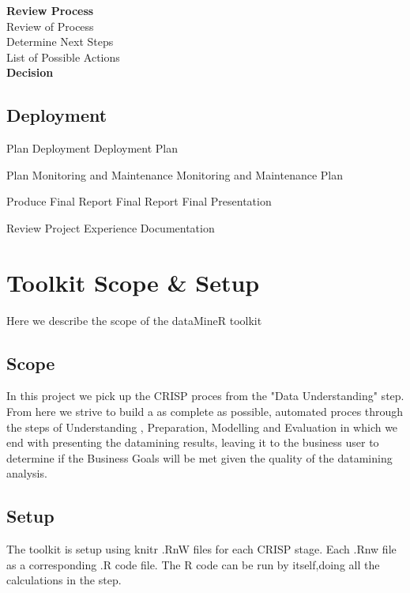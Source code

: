\documentclass[12pt,a4paper,titlepage]{report}\usepackage{graphicx, color}
\begin{document}
\textbf{Review Process} \\ 
Review of Process \\

Determine Next Steps \\
List of Possible Actions \\

\textbf{Decision}

\subsection{Deployment}
Plan Deployment
Deployment Plan

Plan Monitoring and Maintenance
Monitoring and Maintenance Plan

Produce Final Report
Final Report
Final Presentation

Review Project Experience 
Documentation

\section{Toolkit Scope \& Setup}
Here we describe the scope of the dataMineR toolkit
\subsection{Scope}
In this project we pick up the CRISP proces from the "Data Understanding" step. From here we strive to build a as complete as possible, automated proces through the steps of Understanding , Preparation, Modelling and Evaluation in which we end with presenting the datamining results, leaving it to the business user to determine if the Business Goals will be met given the quality of the datamining analysis. 
\subsection{Setup}
The toolkit is setup using knitr .RnW files for each CRISP stage. Each .Rnw file as a corresponding .R code file. The R code can be run by itself,doing all the calculations in the step.
\end{document}
